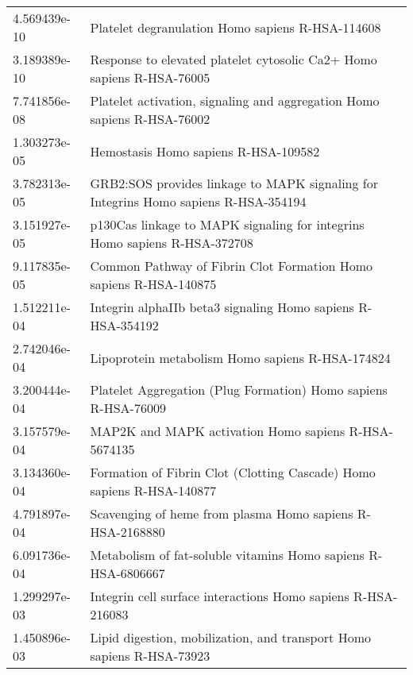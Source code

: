 \begin{longtable}{p{2.4cm}p{14.5cm}}
\bottomrule
\endlastfoot
             4.569439e-10 &                                              Platelet degranulation Homo sapiens R-HSA-114608 \\
             3.189389e-10 &                         Response to elevated platelet cytosolic Ca2+ Homo sapiens R-HSA-76005 \\
             7.741856e-08 &                       Platelet activation, signaling and aggregation Homo sapiens R-HSA-76002 \\
             1.303273e-05 &                                                          Hemostasis Homo sapiens R-HSA-109582 \\
             3.782313e-05 &           GRB2:SOS provides linkage to MAPK signaling for Integrins Homo sapiens R-HSA-354194 \\
             3.151927e-05 &                     p130Cas linkage to MAPK signaling for integrins Homo sapiens R-HSA-372708 \\
             9.117835e-05 &                             Common Pathway of Fibrin Clot Formation Homo sapiens R-HSA-140875 \\
             1.512211e-04 &                                   Integrin alphaIIb beta3 signaling Homo sapiens R-HSA-354192 \\
             2.742046e-04 &                                              Lipoprotein metabolism Homo sapiens R-HSA-174824 \\
             3.200444e-04 &                                Platelet Aggregation (Plug Formation) Homo sapiens R-HSA-76009 \\
             3.157579e-04 &                                          MAP2K and MAPK activation Homo sapiens R-HSA-5674135 \\
             3.134360e-04 &                         Formation of Fibrin Clot (Clotting Cascade) Homo sapiens R-HSA-140877 \\
             4.791897e-04 &                                     Scavenging of heme from plasma Homo sapiens R-HSA-2168880 \\
             6.091736e-04 &                                 Metabolism of fat-soluble vitamins Homo sapiens R-HSA-6806667 \\
             1.299297e-03 &                                  Integrin cell surface interactions Homo sapiens R-HSA-216083 \\
             1.450896e-03 &                         Lipid digestion, mobilization, and transport Homo sapiens R-HSA-73923 \\

\end{longtable}
